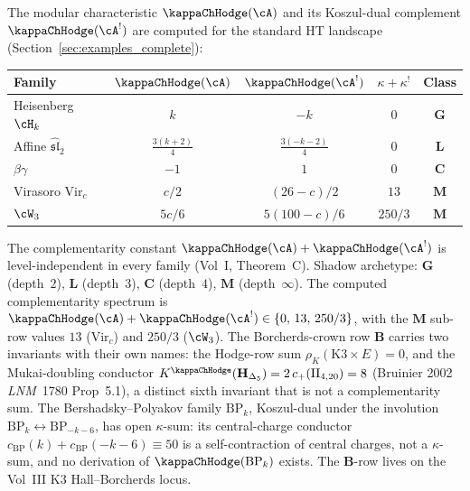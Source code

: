 \begin{remark}
\label{rem:complementarity-table}
The modular characteristic $\kappaChHodge(\cA)$ and its
Koszul-dual complement $\kappaChHodge(\cA^!)$ are computed
for the standard HT landscape
(Section~\ref{sec:examples_complete}):
\begin{center}
\renewcommand{\arraystretch}{1.2}
\begin{tabular}{@{}lcccc@{}}
\textbf{Family}
 & $\kappaChHodge(\cA)$
 & $\kappaChHodge(\cA^!)$
 & $\kappa + \kappa^!$
 & \textbf{Class} \\
\hline
Heisenberg $\cH_k$ & $k$ & $-k$ & $0$ & $\mathbf{G}$ \\
Affine $\widehat{\mathfrak{sl}}_2$ & $\tfrac{3(k{+}2)}{4}$ &
 $\tfrac{3(-k{-}2)}{4}$ & $0$ & $\mathbf{L}$ \\
$\beta\gamma$ & $-1$ & $1$ & $0$ & $\mathbf{C}$ \\
Virasoro $\mathrm{Vir}_c$ & $c/2$ & $(26{-}c)/2$ & $13$
 & $\mathbf{M}$ \\
$\cW_3$ & $5c/6$ & $5(100{-}c)/6$ & $250/3$
 & $\mathbf{M}$ \\
\end{tabular}
\end{center}
The complementarity constant $\kappaChHodge(\cA) + \kappaChHodge(\cA^!)$ is
level-independent in every family (Vol~I, Theorem~C).
Shadow archetype:
$\mathbf{G}$ (depth~$2$),
$\mathbf{L}$ (depth~$3$),
$\mathbf{C}$ (depth~$4$),
$\mathbf{M}$ (depth~$\infty$).
The computed complementarity spectrum is
$\kappaChHodge(\cA) + \kappaChHodge(\cA^!) \in \{0,\,13,\,250/3\}$,
with the $\mathbf{M}$ sub-row values $13$ ($\mathrm{Vir}_c$) and
$250/3$ ($\cW_3$). The Borcherds-crown row $\mathbf{B}$ carries two
invariants with their own names: the Hodge-row sum
$\rho_K(\mathrm{K3}\times E) = 0$, and the Mukai-doubling conductor
$K^{\kappaChHodge}(\mathbf H_{\Delta_5}) = 2\,c_+(\mathrm{II}_{4,20}) = 8$
(Bruinier 2002 \emph{LNM}~1780 Prop~5.1), a distinct sixth
invariant that is not a complementarity sum. The
Bershadsky--Polyakov family $\mathrm{BP}_k$, Koszul-dual under the
involution $\mathrm{BP}_k \leftrightarrow \mathrm{BP}_{-k-6}$, has
open $\kappa$-sum: its central-charge conductor
$c_{\mathrm{BP}}(k) + c_{\mathrm{BP}}(-k-6) \equiv 50$ is a
self-contraction of central charges, not a $\kappa$-sum, and no
derivation of $\kappaChHodge(\mathrm{BP}_k)$ exists. The
$\mathbf{B}$-row lives on the Vol~III K3 Hall--Borcherds locus.
\end{remark}

